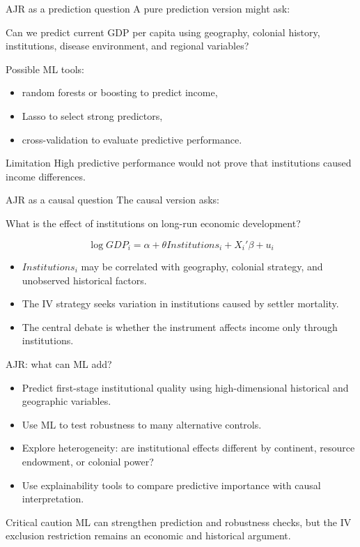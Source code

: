 \documentclass[aspectratio=169,11pt]{beamer}
\begin{document}
\begin{frame}{AJR as a prediction question}
A pure prediction version might ask:
\begin{center}
\Large
Can we predict current GDP per capita using geography, colonial history, institutions, disease environment, and regional variables?
\end{center}
\vspace{0.5em}
Possible ML tools:
\begin{itemize}
  \item random forests or boosting to predict income,
  \item Lasso to select strong predictors,
  \item cross-validation to evaluate predictive performance.
\end{itemize}
\begin{alertblock}{Limitation}
High predictive performance would not prove that institutions caused income differences.
\end{alertblock}
\end{frame}

\begin{frame}{AJR as a causal question}
The causal version asks:
\begin{center}
\Large
What is the effect of institutions on long-run economic development?
\end{center}
\[
\log GDP_i = \alpha + \theta Institutions_i + X_i'\beta + u_i
\]
\begin{itemize}
  \item $Institutions_i$ may be correlated with geography, colonial strategy, and unobserved historical factors.
  \item The IV strategy seeks variation in institutions caused by settler mortality.
  \item The central debate is whether the instrument affects income only through institutions.
\end{itemize}
\end{frame}

\begin{frame}{AJR: what can ML add?}
\begin{itemize}
  \item Predict first-stage institutional quality using high-dimensional historical and geographic variables.
  \item Use ML to test robustness to many alternative controls.
  \item Explore heterogeneity: are institutional effects different by continent, resource endowment, or colonial power?
  \item Use explainability tools to compare predictive importance with causal interpretation.
\end{itemize}
\begin{alertblock}{Critical caution}
ML can strengthen prediction and robustness checks, but the IV exclusion restriction remains an economic and historical argument.
\end{alertblock}
\end{frame}
\end{document}
